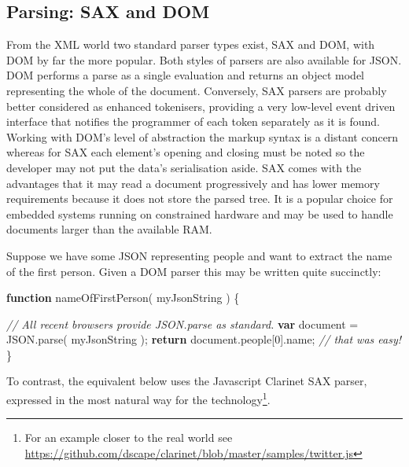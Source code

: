 \documentclass[12pt, ]{article}
\newenvironment{Shaded}{}{}
\newcommand{\KeywordTok}[1]{\textcolor[rgb]{0.00,0.44,0.13}{\textbf{{#1}}}}
\newcommand{\DecValTok}[1]{\textcolor[rgb]{0.25,0.63,0.44}{{#1}}}
\newcommand{\CommentTok}[1]{\textcolor[rgb]{0.38,0.63,0.69}{\textit{{#1}}}}
\newcommand{\OtherTok}[1]{\textcolor[rgb]{0.00,0.44,0.13}{{#1}}}
\newcommand{\FunctionTok}[1]{\textcolor[rgb]{0.02,0.16,0.49}{{#1}}}
\newcommand{\NormalTok}[1]{{#1}}
\begin{document}
\subsection{Parsing: SAX and DOM}\label{parsing-sax-and-dom}

From the XML world two standard parser types exist, SAX and DOM, with
DOM by far the more popular. Both styles of parsers are also available
for JSON. DOM performs a parse as a single evaluation and returns an
object model representing the whole of the document. Conversely, SAX
parsers are probably better considered as enhanced tokenisers, providing
a very low-level event driven interface that notifies the programmer of
each token separately as it is found. Working with DOM's level of
abstraction the markup syntax is a distant concern whereas for SAX each
element's opening and closing must be noted so the developer may not put
the data's serialisation aside. SAX comes with the advantages that it
may read a document progressively and has lower memory requirements
because it does not store the parsed tree. It is a popular choice for
embedded systems running on constrained hardware and may be used to
handle documents larger than the available RAM.

Suppose we have some JSON representing people and want to extract the
name of the first person. Given a DOM parser this may be written quite
succinctly:

\begin{Shaded}
\begin{Highlighting}[]
\KeywordTok{function} \FunctionTok{nameOfFirstPerson}\NormalTok{( myJsonString ) \{}

   \CommentTok{// All recent browsers provide JSON.parse as standard. }
   \KeywordTok{var} \NormalTok{document = }\OtherTok{JSON}\NormalTok{.}\FunctionTok{parse}\NormalTok{( myJsonString );}
   \KeywordTok{return} \OtherTok{document}\NormalTok{.}\FunctionTok{people}\NormalTok{[}\DecValTok{0}\NormalTok{].}\FunctionTok{name}\NormalTok{; }\CommentTok{// that was easy!}
\NormalTok{\}}
\end{Highlighting}
\end{Shaded}

To contrast, the equivalent below uses the Javascript Clarinet SAX
parser, expressed in the most natural way for the technology\footnote{For
  an example closer to the real world see
  \url{https://github.com/dscape/clarinet/blob/master/samples/twitter.js}}.
\end{document}
